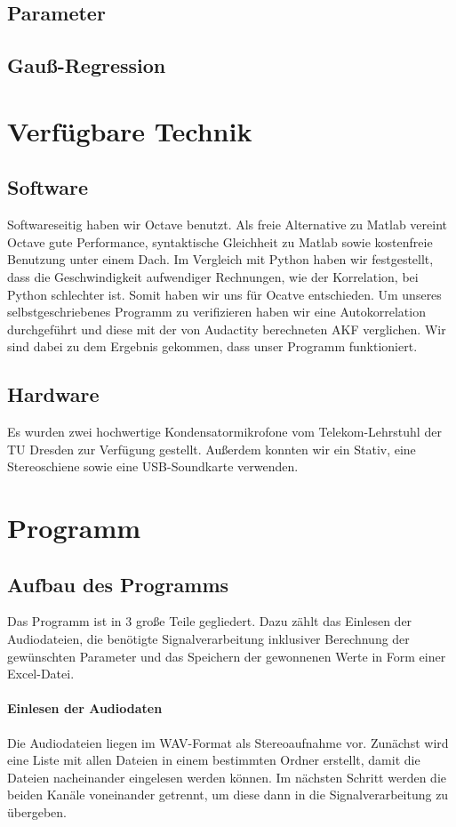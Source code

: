 \documentclass[a4paper,11pt]{article}
\begin{document}
\subsection{Parameter}
\subsection{Gauß-Regression}

\section{Verfügbare Technik}
\subsection{Software}
Softwareseitig haben wir Octave benutzt. Als freie Alternative zu Matlab vereint Octave gute Performance, syntaktische Gleichheit zu Matlab sowie kostenfreie Benutzung unter einem Dach. Im Vergleich mit Python haben wir festgestellt, dass die Geschwindigkeit aufwendiger Rechnungen, wie der Korrelation, bei Python schlechter ist. Somit haben wir uns für Ocatve entschieden. Um unseres selbstgeschriebenes Programm zu verifizieren haben wir eine Autokorrelation durchgeführt und diese mit der von Audactity berechneten AKF verglichen. Wir sind dabei zu dem Ergebnis gekommen, dass unser Programm funktioniert.
\subsection{Hardware}
Es wurden zwei hochwertige Kondensatormikrofone vom Telekom-Lehrstuhl der TU Dresden zur Verfügung gestellt. Außerdem konnten wir ein Stativ, eine Stereoschiene sowie eine USB-Soundkarte verwenden.
\section{Programm}
\subsection{Aufbau des Programms}
Das Programm ist in 3 große Teile gegliedert. Dazu zählt das Einlesen der Audiodateien, die benötigte Signalverarbeitung inklusiver Berechnung der gewünschten Parameter und das Speichern der gewonnenen Werte in Form einer Excel-Datei.
\paragraph{Einlesen der Audiodaten}
Die Audiodateien liegen im WAV-Format als Stereoaufnahme vor. Zunächst wird eine Liste mit allen Dateien in einem bestimmten Ordner erstellt, damit die Dateien nacheinander eingelesen werden können. Im nächsten Schritt werden die beiden Kanäle voneinander getrennt, um diese dann in die Signalverarbeitung zu übergeben.
\end{document}
